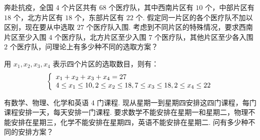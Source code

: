 \documentclass[cn, hazy, blue, normal, 12pt]{elegantnote}
\begin{document}
\begin{exercise}

    奔赴抗疫，全国 $4$ 个片区共有 $68$ 个医疗队，其中西南片区有 $10$ 个，中部片区有 $18$ 个，北方片区有 $18$ 个，东部片区有 $22$ 个. 假定同一片区的各个医疗队不加以区别，现在要从中选取 $27$ 个医疗队入围. 考虑到不同片区的特殊情况，要求西南片区至少入围 $4$ 个医疗队，北方片区至少入围 $7$ 个医疗队，其他片区至少各入围 $2$ 个医疗队，问理论上有多少种不同的选取方案？

\end{exercise}

\begin{solution}[print=true]

    用 $x_{1}, x_{2}, x_{3}, x_{4}$ 表示四个片区的选取数目，则有：
    \begin{equation}
        \notag
        \left\{\begin{array}{l}
            x_{1}+x_{2}+x_{3}+x_{4}=27 \\
            4 \leq x_1 \leq 10,
            2 \leq x_2 \leq 18,
            7 \leq x_3 \leq 18,
            2 \leq x_4 \leq 22
        \end{array}\right.
    \end{equation}

\end{solution}

\begin{exercise}

    有数学、物理、化学和英语 $4$ 门课程. 现从星期一到星期四安排这四门课程，每门课程安排一天，每天安排一门课程. 要求数学不能安排在星期一和星期二，物理不能安排在星期三，化学不能安排在星期四，英语不能安排在星期二. 问有多少种不同的安排方案？

\end{exercise}
\end{document}
